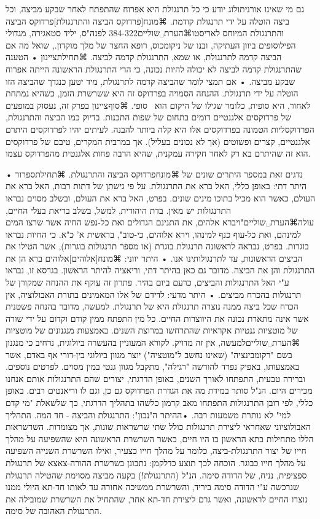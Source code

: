 ﻿גם מי שאינו אורניתולוג יודע כי כל תרנגולת היא אפרוח שהתפתח לאחר שבקע מביצה, וכל ביצה הוטלה על ידי תרנגולת קודמת. ⌘מונח[פרדוקס הביצה והתרנגולת]{פרדוקס הביצה והתרנגולת} המיוחס לאריסטו⌘הערת␣שוליים{384-322 לפנה"ס, יליד סטאגירה, מגדולי הפילוסופים ביוון העתיקה, ובנו של ניקומכוס, רופא החצר של מלך מוקדון.}, שואל מה אם הביצה קדמה לתרנגולת, או שמא, התרנגולת קדמה לביצה. 
⌘תחילת{ציינון}
• הטענה שהתרנגולת קדמה לביצה לא יכולה להיות נכונה, כי הרי התרנגולת הראשונה הייתה אפרוח שבקע מביצה.
• אם תמצי לומר שהביצה קדמה לתרנגולת, מיד יטען כנגדך שהביצה הזו הוטלה על ידי תרנגולת. 
ההנחה הסמויה בפרדוקס זה היא ששרשרת הזמן, כשהיא נמתחת לאחור, היא סופית, כלומר שגילו של היקום הוא  סופי.
⌘סוף{ציינון}
בפרק זה, נעסוק במופעים של פרדוקסים אלגנטיים דומים בתחום של שפות התכנות. בדיוק כמו הביצה והתרנגולת, הפרדוקסליות הטמונה בפרדוקסים אלו היא קלה ביותר להבנה. לעיתים יהיו לפרדוקסים היתרם אלגנטיים, קצרים ופשוטים (אך לא נכונים בעליל). אך במרבית המקרים, טיבם של פרדוקסים הוא זה שהיתרם בא רק לאחר חקירה עמקנית, שהיא הרבה פחות אלגנטית מהפרדוקס עצמו.

נדגים זאת במספר היתרים שונים של ⌘מונח{פרדוקס הביצה והתרנגולת}. 
⌘תחילת{ספרור}
• היתר דתי: באופן כללי, האל ברא את התרנגולת. על פי גישתן של דתות רבות, האל ברא את העולם, כאשר הוא מכיל בתוכו מינים שונים. בפרט, האל ברא את העולם, ובשלב מסוים נבראו התרנגולות יש מאין. בדת היהודית, למשל, בשלב בריאת בעלי החיים, עולה⌘הערת␣שוליים{"ויברא אלהים, את התנינם הגדולים ואת כל-נפש החיה אשר שרצו המים למינהם, ואת כל-עוף כנף למינהו, וירא אלוהים, כי-טוב", בראשית א' כ"א.} כי החיות נבראו בוגרות. בפרט, נבראה לראשונה תרנגולת בוגרת (או מספר תרנגולות בוגרות), אשר הטילו את הביצים הראשונות, עד לתרנגולותינו אנו. 
• היתר יווני: ⌘מונח[אלוהים]{אלוהים} ברא הן את התרנגולת והן את הביצה. מדובר גם כאן בהיתר דתי, וריאציה להיתר הראשון. בגרסא זו, נבראו ע"י האל התרנגולות והביצים, כרעם ביום בהיר. פתרון זה עוקף את ההנחה שמקורן של תרנגולות בהכרח מביצים.
• היתר מדעי: לדידם של אלו המאמינים בתורת האבולוציה, אין הכרח שכל ביצה ממנה נוצרה תרנגולת היא של תרנגולת. למעשה, מדובר בהנחה פשטנית אשר אינה מתארת נכונה את היווצרות החיים. כל מין התפתח ממין קודם וקדום על ידי שורה של מוטציות גנטיות אקראיות שהתרחשו במרוצת השנים. באמצעות מנגנונים של מוטציות ⌘הערת␣שוליים{למעשה, אין זה מדויק. לקורא המעוניין בהעשרה ביולוגית, נרחיב כי מנגנון בשם "רקומבינציה" (שאינו נחשב ל"מוטציה") יוצר מגוון ביולוגי בין-דורי אף באדם, אשר באמצעותו, באפיק נפרד להורשה "רגילה", מתקבל מגוון גנטי במין מסוים. לפרטים נוספים.} וברירה טבעית, התפתחו לאורך השנים, באופן הדרגתי, יצורים שהם התרנגולות אותם אנחנו מכירים היום. הנ"ל סותר במידת מה את הגדרת הפרדוקס גם כן, וגם לו וריאנטים רבים. באופן כללי, לפי רובן התרנגולות התפתחו מאב קדמון כלשהו בתהליך הדרגתי, כך שלשאלת "מי קדם למי" לא נותרת משמעות רבה. 
•ההיתר ה"נכון": התרנגולת והביצה - חד המה. התהליך האבולוציוני שאחראי ליצירת תרנגולות כולל שתי שרשראות שונות, אך מצומדות. השרשראות הללו מתחילות בתא הראשון בו היו חיים, כאשר השרשרת הראשונה היא שהשפיעה על מהלך חייו של יצור התרנגולת-ביצה, כלומר על מהלך חייו כצעיר, ואילו השרשרת השנייה השפיעה על מהלך חייו כבוגר. הוכחה לכך תוצע כדלקמן: נתבונן בשרשרת ההורה-צאצא של תרנגולת ספציפית, נניח, של הדודה סימה. הנ"ל (התרנגולת!) בקעה מביצה מסוימת שהטילה תרנגולת שנרכשה ע"י הדודה סימה ביריד, והשרשרת ממשיכה אחורה עד לאותו חד-תא היולי ממנו נוצרו החיים לראשונה, ואשר גרם ליצירת חד-תא אחר, שהתחיל את השרשרת שמובילה את התרנגולת האהובה של סימה.

